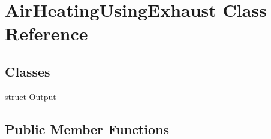\hypertarget{class_air_heating_using_exhaust}{}\section{Air\+Heating\+Using\+Exhaust Class Reference}
\label{class_air_heating_using_exhaust}
\subsection*{Classes}
\begin{DoxyCompactItemize}
\item 
struct \hyperlink{struct_air_heating_using_exhaust_1_1_output}{Output}
\end{DoxyCompactItemize}
\subsection*{Public Member Functions}
